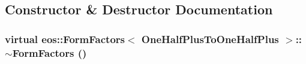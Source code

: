 \subsection{Constructor \& Destructor Documentation}
\hypertarget{classeos_1_1FormFactors_3_01OneHalfPlusToOneHalfPlus_01_4_ad1d749d5f305db904000c4e4635d62ed}{
\subsubsection[{$\sim$FormFactors}]{\setlength{\rightskip}{0pt plus 5cm}virtual eos::FormFactors$<$ {\bf OneHalfPlusToOneHalfPlus} $>$::$\sim$FormFactors ()}}
\label{classeos_1_1FormFactors_3_01OneHalfPlusToOneHalfPlus_01_4_ad1d749d5f305db904000c4e4635d62ed}


